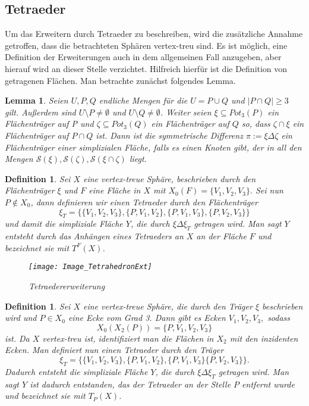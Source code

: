 \documentclass[12pt,titlepage,twoside,cleardoublepage]{article}
\theoremstyle{nummermitklammern}
\newtheorem{lemma}[temp]{Lemma}
\newtheorem{definition}[temp]{Definition}
\newtheorem{definition}[zahl]{Definition}
\newtheorem{lemma}[zahl]{Lemma}
\numberwithin{equation}{section}
\begin{document}
  \subsection{Tetraeder}
 Um das Erweitern durch Tetraeder zu beschreiben, wird die zusätzliche Annahme getroffen, dass die betrachteten Sphären vertex-treu sind. Es ist möglich, eine Definition der Erweiterungen auch in dem allgemeinen Fall anzugeben, aber hierauf wird an dieser Stelle verzichtet.
 Hilfreich hierfür ist die Definition von getragenen Flächen. Man betrachte zunächst folgendes Lemma.
\begin{lemma}
Seien $U,P,Q$ endliche Mengen für die $U=P\cup Q$ und $\vert P\cap Q \vert \geq 3$ gilt. Außerdem sind $U\setminus P\neq \emptyset$ und $U\setminus Q \neq \emptyset$. Weiter seien $\xi \subseteq Pot_3(P)$ ein Flächenträger auf P und $\zeta \subseteq Pot_3(Q)$ ein Flächenträger auf $Q$ so, dass $\zeta \cap \xi$ ein Flächenträger auf $P \cap Q$ ist. Dann ist die symmetrische Differenz $\pi :=\xi \Delta \zeta$ ein Flächenträger einer simplizialen Fläche, falls es einen Knoten gibt, der in all den Mengen $\mathcal{S}(\xi),\mathcal{S}(\zeta),\mathcal{S}(\xi\cap\zeta)$ liegt. 
\end{lemma}

\begin{definition}
Sei $X$ eine vertex-treue Sphäre, beschrieben durch den Flächenträger $\xi$ und $F$ eine Fläche in $X$ mit $X_0(F)=\{V_1,V_2,V_3\}.$ Sei nun $P\notin X_0$, dann definieren wir einen Tetraeder durch den Flächenträger
\[
\xi_T=\{\{V_1,V_2,V_3\},\{P,V_1,V_2\},\{P,V_1,V_3\},\{P,V_2,V_3\}\}
\] 
und damit die simpliziale Fläche $Y$, die durch $\xi \Delta \xi_T$ getragen wird. Man sagt $Y$ entsteht durch das Anhängen eines Tetraeders an $X$ an der Fläche $F$ und bezeichnet sie mit $T^F(X)$.
\begin{figure}[H]
\begin{center}
\texttt{[image: Image\_TetrahedronExt]}
\end{center}
\caption{Tetraedererweiterung}
\end{figure}

\end{definition}

\begin{definition}
Sei $X$ eine vertex-treue Sphäre, die durch den Träger $\xi$ beschrieben wird und $P\in X_0$ eine Ecke vom Grad 3. Dann gibt es Ecken $V_1,V_2,V_3,$ sodass
\[
X_0(X_2(P))=\{P,V_1,V_2,V_3\}
\] 
ist. Da $X$ vertex-treu ist, identifiziert man die Flächen in $X_2$  mit den inzidenten Ecken.  Man definiert nun einen Tetraeder durch den Träger 
\[
\xi_T=\{\{V_1,V_2,V_3\},\{P,V_1,V_2\},\{P,V_1,V_3\}\{P,V_2,V_3\}\}.
\]  Dadurch entsteht die simpliziale Fläche $Y$, die durch $\xi \Delta \xi_T$ getragen wird. Man sagt $Y$ ist dadurch entstanden, das der Tetraeder an der Stelle $P$ entfernt wurde und bezeichnet sie mit $T_P(X)$.
\end{definition}
\end{document}
